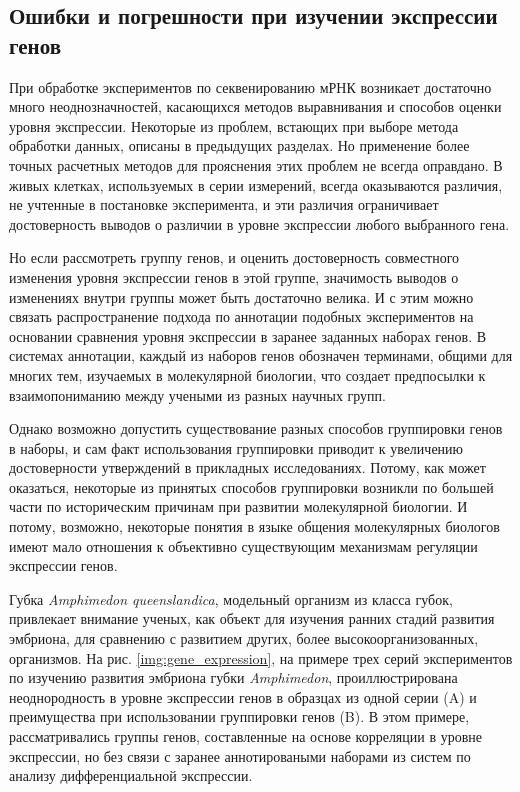 \subsection{Ошибки и погрешности при изучении экспрессии генов} \label{sect_expressionbiases}

При обработке экспериментов по секвенированию мРНК возникает достаточно много неоднозначностей, касающихся методов выравнивания и способов оценки уровня экспрессии. Некоторые из проблем, встающих при выборе метода обработки данных, описаны в предыдущих разделах. Но применение более точных расчетных методов для прояснения этих проблем не всегда оправдано. В живых клетках, используемых в серии измерений, всегда оказываются различия, не учтенные в постановке эксперимента, и эти различия ограничивает достоверность выводов о различии в уровне экспрессии любого выбранного гена.

Но если рассмотреть группу генов, и оценить достоверность совместного изменения уровня экспрессии генов в этой группе, значимость выводов о изменениях внутри группы может быть достаточно велика. И с этим можно связать распространение подхода по аннотации подобных экспериментов на основании сравнения уровня экспрессии в заранее заданных наборах генов. В системах аннотации, каждый из наборов генов обозначен терминами, общими для многих тем, изучаемых в молекулярной биологии, что создает предпосылки к взаимопониманию между учеными из разных научных групп.


	
Однако возможно допустить существование разных способов группировки генов в наборы, и сам факт использования группировки приводит к увеличению достоверности утверждений в прикладных исследованиях. Потому, как может оказаться, некоторые из принятых способов группировки возникли по большей части по историческим причинам при развитии молекулярной биологии. И потому, возможно, некоторые понятия в языке общения молекулярных биологов имеют мало отношения к объективно существующим механизмам регуляции экспрессии генов.

Губка \textit{Amphimedon queenslandica}, модельный организм из класса губок, привлекает внимание ученых, как объект для изучения ранних стадий развития эмбриона, для сравнению с развитием других, более высокоорганизованных, организмов. На рис. \ref{img:gene_expression}, на примере трех серий экспериментов по изучению развития эмбриона губки \textit{Amphimedon}, проиллюстрирована неоднородность в уровне экспрессии генов в образцах из одной серии (A) и преимущества при использовании группировки генов (B). В этом примере, рассматривались группы генов, составленные на основе корреляции в уровне экспрессии, но без связи с заранее аннотироваными наборами из систем по анализу дифференциальной экспрессии.



